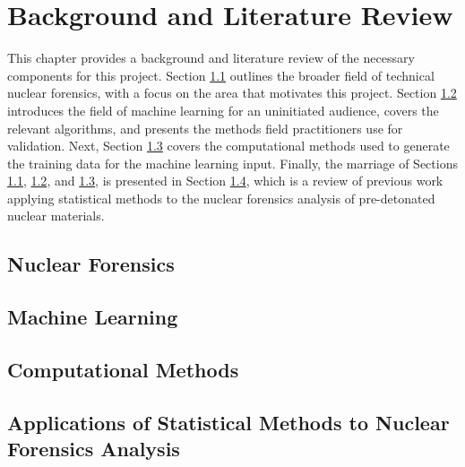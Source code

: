\chapter{Background and Literature Review}
\label{ch:litrev}

This chapter provides a background and literature review of the necessary
components for this project. Section \ref{sec:nfoverview} outlines the broader
field of technical nuclear forensics, with a focus on the area that motivates
this project.  Section \ref{sec:mlback} introduces the field of machine
learning for an uninitiated audience, covers the relevant algorithms, and
presents the methods field practitioners use for validation. Next, Section
\ref{sec:fcsim} covers the computational methods used to generate the training
data for the machine learning input. Finally, the marriage of Sections
\ref{sec:nfoverview}, \ref{sec:mlback}, and \ref{sec:fcsim}, is presented in
Section \ref{sec:stats4nf}, which is a review of previous work applying
statistical methods to the nuclear forensics analysis of pre-detonated nuclear
materials. 

\section{Nuclear Forensics}
\label{sec:nfoverview}


\section{Machine Learning}
\label{sec:mlback}


\section{Computational Methods}
\label{sec:fcsim}


\section{Applications of Statistical Methods to Nuclear Forensics Analysis}
\label{sec:stats4nf}


